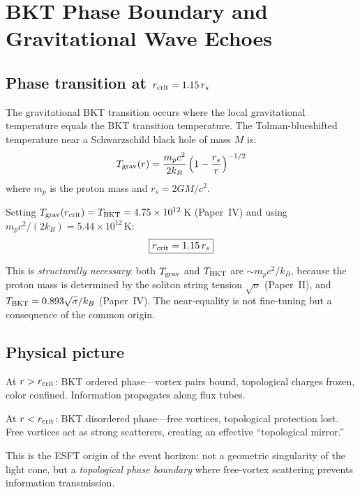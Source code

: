 ﻿\documentclass[twocolumn,preprintnumbers,amsmath,amssymb,prd]{revtex4-2}
\begin{document}
\section{BKT Phase Boundary and Gravitational Wave Echoes}
\label{sec:echo}

\subsection{Phase transition at $r_{\rm crit} = 1.15\,r_s$}

The gravitational BKT transition occurs where the local gravitational temperature equals the BKT transition temperature. The Tolman-blueshifted temperature near a Schwarzschild black hole of mass $M$ is:
\begin{equation}
T_{\rm grav}(r) = \frac{m_p c^2}{2k_B}\left(1 - \frac{r_s}{r}\right)^{-1/2}
\label{eq:Tgrav}
\end{equation}
where $m_p$ is the proton mass and $r_s = 2GM/c^2$.

Setting $T_{\rm grav}(r_{\rm crit}) = T_{\rm BKT} = 4.75\times10^{12}\,$K (Paper~IV) and using $m_p c^2/(2k_B) = 5.44\times10^{12}\,$K:
\begin{equation}
\boxed{r_{\rm crit} = 1.15\,r_s}
\label{eq:rcrit}
\end{equation}

This is \emph{structurally necessary}: both $T_{\rm grav}$ and $T_{\rm BKT}$ are $\sim m_p c^2/k_B$, because the proton mass is determined by the soliton string tension $\sqrt{\sigma}$ (Paper~II), and $T_{\rm BKT} = 0.893\sqrt{\sigma}/k_B$ (Paper~IV). The near-equality is not fine-tuning but a consequence of the common origin.

\subsection{Physical picture}

At $r > r_{\rm crit}$: BKT ordered phase---vortex pairs bound, topological charges frozen, color confined. Information propagates along flux tubes.

At $r < r_{\rm crit}$: BKT disordered phase---free vortices, topological protection lost. Free vortices act as strong scatterers, creating an effective ``topological mirror.''

This is the ESFT origin of the event horizon: not a geometric singularity of the light cone, but a \emph{topological phase boundary} where free-vortex scattering prevents information transmission.
\end{document}
